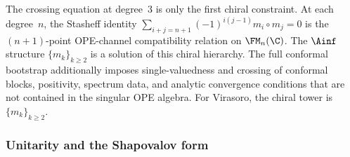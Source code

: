 \begin{remark}
\label{rem:ainf-solves-bootstrap}%
%
The crossing equation at degree~$3$ is only the first chiral
constraint.  At each degree~$n$, the Stasheff identity
$\sum_{i+j=n+1}(-1)^{i(j-1)} m_i \circ m_j = 0$ is the
$(n+1)$-point OPE-channel compatibility relation on $\FM_n(\C)$.
The $\Ainf$ structure $\{m_k\}_{k \ge 2}$ is a solution of this
chiral hierarchy. The full conformal bootstrap additionally
imposes single-valuedness and crossing of conformal blocks,
positivity, spectrum data, and analytic convergence conditions
that are not contained in the singular OPE algebra. For Virasoro,
the chiral tower is $\{m_k\}_{k \ge 2}$.
\end{remark}

\subsubsection*{Unitarity and the Shapovalov form}

